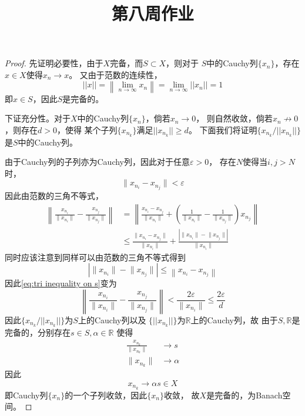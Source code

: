 \documentclass[cn]{homework}
\title{第八周作业}
\begin{document}
    \maketitle

    \problem
    \begin{proof}
        先证明必要性，由于$X$完备，而$S\subset X$，则对于
        $S$中的Cauchy列$\{x_n\}$，存在$x\in X$使得$x_n\to x$。
        又由于范数的连续性，
        \[||x||=\left\|\lim_{n\to\infty}x_n\right\|
        =\lim_{n\to\infty}||x_n||=1\]
        即$x\in S$，因此$S$是完备的。

        下证充分性。对于$X$中的Cauchy列$\{x_n\}$，倘若$x_n\to 0$，
        则自然收敛，倘若$x_n\not\to 0$，则存在$d>0$，使得
        某个子列$\{x_{n_k}\}$满足$||x_{n_k}||\geq d$。
        下面我们将证明$\{x_{n_k}/||x_{n_k}||\}$是$S$中的Cauchy列。

        由于Cauchy列的子列亦为Cauchy列，因此对于任意$\varepsilon>0$，
        存在$N$使得当$i,j>N$时，
        \newcommand{\norm}[1]{\Big\| #1 \Big\|}
        \newcommand{\xni}{x_{n_i}}
        \newcommand{\xnj}{x_{n_j}}
        \newcommand{\si}{\frac{\xni}{\norm\xni}}
        \newcommand{\sj}{\frac{\xnj}{\norm\xnj}}
        \[\norm{\xni-\xnj}<\varepsilon\]
        因此由范数的三角不等式，
        \begin{equation}
            \label{eq:tri inequality on s}
            \begin{aligned}
            \left\|\si-\sj\right\|&=
            \left\|\frac{\xni-\xnj}{\norm\xni}
            +\left(\frac{1}{\norm\xni}-\frac{1}{\norm\xnj}\right)\xnj\right\|\\
            &\leq\frac{\norm{\xni-\xnj}}{\norm\xni}
              +\frac{\left|\norm\xni-\norm\xnj\right|}{\norm\xni}
            \end{aligned}
        \end{equation}
        同时应该注意到同样可以由范数的三角不等式得到
        \[\left|\norm\xni-\norm\xnj\right|
        \leq\left\|\xni-\xnj\right\|\]
        因此\cref{eq:tri inequality on s}变为
        \[\left\|\si-\sj\right\|<\frac{2\varepsilon}{\norm\xni}
        \leq\frac{2\varepsilon}{d}\]
        因此$\{x_{n_k}/||x_{n_k}||\}$为$S$上的Cauchy列以及
        $\{||x_{n_k}||\}$为$\mathbb R$上的Cauchy列，故
        由于$S,\mathbb R$是完备的，分别存在$s\in S,\alpha\in\mathbb R$
        使得
        \[\begin{aligned}
            \frac{x_{n_k}}{\norm{x_{n_k}}}&\to s\\
            \norm{x_{n_k}}&\to \alpha
        \end{aligned}\]
        因此
        \[x_{n_k}\to \alpha s\in X\]
        即Cauchy列$\{x_n\}$的一个子列收敛，因此$\{x_n\}$收敛，
        故$X$是完备的，为Banach空间。
    \end{proof}
\end{document}

